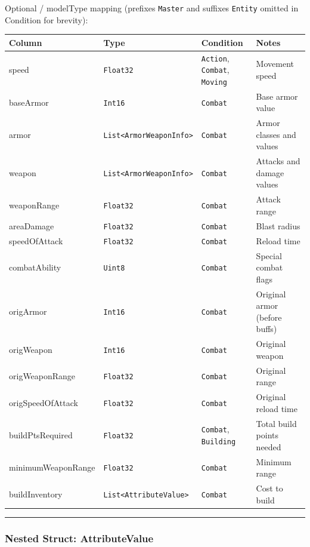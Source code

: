 Optional / modelType mapping (prefixes \texttt{Master} and suffixes \texttt{Entity} omitted in Condition for brevity):

\begin{longtable}{@{}p{}p{}p{}p{}@{}}
  \toprule
  Column & Type & Condition & Notes \\
  \midrule
  \endhead
  speed & \texttt{Float32} & \texttt{Action}, \texttt{Combat}, \texttt{Moving} & Movement speed \\
  baseArmor & \texttt{Int16} & \texttt{Combat} & Base armor value \\
  armor & \texttt{List\-<Armor}\-\texttt{Weapon}\-\texttt{Info>} & \texttt{Combat} & Armor classes and values \\
  weapon & \texttt{List\-<Armor}\-\texttt{Weapon}\-\texttt{Info>} & \texttt{Combat} & Attacks and damage values \\
  weaponRange & \texttt{Float32} & \texttt{Combat} & Attack range \\
  areaDamage & \texttt{Float32} & \texttt{Combat} & Blast radius \\
  speedOfAttack & \texttt{Float32} & \texttt{Combat} & Reload time \\
  combatAbility & \texttt{Uint8} & \texttt{Combat} & Special combat flags \\
  origArmor & \texttt{Int16} & \texttt{Combat} & Original armor (before buffs) \\
  origWeapon & \texttt{Int16} & \texttt{Combat} & Original weapon \\
  origWeaponRange & \texttt{Float32} & \texttt{Combat} & Original range \\
  origSpeedOfAttack & \texttt{Float32} & \texttt{Combat} & Original reload time \\
  buildPtsRequired & \texttt{Float32} & \texttt{Combat}, \texttt{Building} & Total build points needed \\
  minimumWeaponRange & \texttt{Float32} & \texttt{Combat} & Minimum range \\
  buildInventory & \texttt{List\-<Attribute}\-\texttt{Value>} & \texttt{Combat} & Cost to build \\
  \bottomrule
\end{longtable}

\par\noindent\rule{\textwidth}{0.4pt}

\subsubsection*{Nested Struct: AttributeValue}

